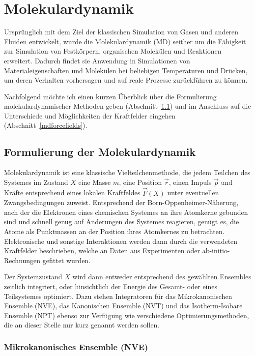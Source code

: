 \section{Molekulardynamik}
\label{md}

Ursprünglich mit dem Ziel der klassischen Simulation von Gasen und anderen Fluiden entwickelt, wurde die Molekulardynamik (MD)\cite{hoover_molecular_1986} seither um die Fähigkeit zur Simulation von Festkörpern, organischen Molekülen und Reaktionen erweitert.
Dadurch findet sie Anwendung in Simulationen von Materialeigenschaften und Molekülen bei beliebigen Temperaturen und Drücken, um deren Verhalten vorhersagen und auf reale Prozesse zurückführen zu können.

Nachfolgend möchte ich einen kurzen Überblick über die Formulierung molekulardynamischer Methoden geben (Abschnitt~\ref{mdformulation}) und im Anschluss auf die Unterschiede und Möglichkeiten der Kraftfelder eingehen (Abschnitt~\ref{mdforcefields}).

\subsection{Formulierung der Molekulardynamik}
\label{mdformulation}

Molekulardynamik ist eine klassische Vielteilchenmethode, die jedem Teilchen des Systemes im Zustand $X$ eine Masse $m$, eine Position $\vec r$, einen Impuls $\vec p$ und Kräfte entsprechend eines lokalen Kraftfeldes $\vec{F}(X)$ unter eventuellen Zwangsbedingungen zuweist.
Entsprechend der Born-Oppenheimer-Näherung, nach der die Elektronen eines chemischen Systemes an ihre Atomkerne gebunden sind und schnell genug auf Änderungen des Systemes reagieren, genügt es, die Atome als Punktmassen an der Position ihres Atomkernes zu betrachten.
Elektronische und sonstige Interaktionen werden dann durch die verwendeten Kraftfelder beschrieben, welche an Daten aus Experimenten oder ab-initio-Rechnungen gefittet wurden.

Der Systemzustand $X$ wird dann entweder entsprechend des gewählten Ensembles zeitlich integriert, oder hinsichtlich der Energie des Gesamt- oder eines Teilsystemes optimiert.
Dazu stehen Integratoren für das Mikrokanonischen Ensemble (NVE), das Kanonischen Ensemble (NVT) und das Isotherm-Isobare Ensemble (NPT) ebenso zur Verfügung wie verschiedene Optimierungsmethoden, die an dieser Stelle nur kurz genannt werden sollen.

\subsubsection{Mikrokanonisches Ensemble (NVE)}

